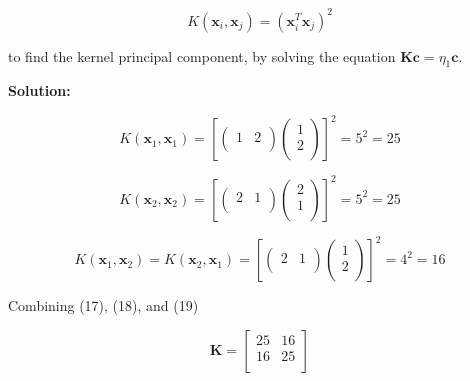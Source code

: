 \documentclass[11pt]{article}
\begin{document}
\begin{enumerate}
\begin{equation*}
K(\mathbf{x}_i, \mathbf{x}_j) = (\mathbf{x}_i^\mathit{T}\mathbf{x}_j)^2
\end{equation*}

to find the kernel principal component, by solving the equation $\mathbf{Kc} = \eta_1\mathbf{c}$.

\textbf{Solution:}

\begin{equation}
K(\mathbf{x}_1, \mathbf{x}_1) = 
	\left[
		\left(
			\begin{array}{cc}
				1 & 2 \\
			\end{array}
		\right)
		\left(
			\begin{array}{c}
				1 \\
				2 \\
			\end{array}
		\right)
	\right]^2
	=
	5^2
	=
	25
\end{equation}

\begin{equation}
K(\mathbf{x}_2, \mathbf{x}_2) = 
	\left[
		\left(
			\begin{array}{cc}
				2 & 1 \\
			\end{array}
		\right)
		\left(
			\begin{array}{c}
				2 \\
				1 \\
			\end{array}
		\right)
	\right]^2
	=
	5^2
	=
	25
\end{equation}

\begin{equation}
K(\mathbf{x}_1, \mathbf{x}_2) = 
K(\mathbf{x}_2, \mathbf{x}_1) = 
	\left[
		\left(
			\begin{array}{cc}
				2 & 1 \\
			\end{array}
		\right)
		\left(
			\begin{array}{c}
				1 \\
				2 \\
			\end{array}
		\right)
	\right]^2
	=
	4^2
	=
	16
\end{equation}

Combining (17), (18), and (19)

\begin{equation}
\mathbf{K} =
\left[
	\begin{array}{cc}
		25 & 16 \\
		16 & 25 \\	
	\end{array}
\right]
\end{equation}


\end{enumerate}
\end{document}
